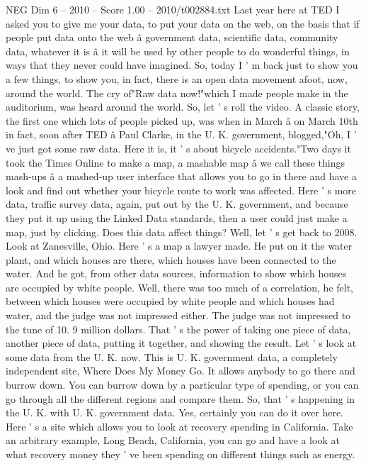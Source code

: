\begin{textsample}{NEG Dim 6 – 2010 – Score 1.00 – 2010/t002884.txt}  \label{ex:f6_neg_041}
Last year here at TED I asked you to give me your data, to put your data on the web, on the basis that if people put data onto the web â government data, scientific data, community data, whatever it is â it will be used by other people to do wonderful things, in ways that they never could have imagined.
So, today I ' m back just to show you a few things, to show you, in fact, there is an open data movement afoot, now, around the world.
The cry of"Raw data now!"which I made people make in the auditorium, was heard around the world.
So, let ' s roll the video.
A classic story, the first one which lots of people picked up, was when in March â on March 10th in fact, soon after TED â Paul Clarke, in the U.
K. government, blogged,"Oh, I ' ve just got some raw data.
Here it is, it ' s about bicycle accidents."Two days it took the Times Online to make a map, a mashable map â we call these things mash-ups â a mashed-up user interface that allows you to go in there and have a look and find out whether your bicycle route to work was affected.
Here ' s more data, traffic survey data, again, put out by the U.
K. government, and because they put it up using the Linked Data standards, then a user could just make a map, just by clicking.
Does this data affect things?
Well, let ' s get back to 2008.
Look at Zanesville, Ohio.
Here ' s a map a lawyer made.
He put on it the water plant, and which houses are there, which houses have been connected to the water.
And he got, from other data sources, information to show which houses are occupied by white people.
Well, there was too much of a correlation, he felt, between which houses were occupied by white people and which houses had water, and the judge was not impressed either.
The judge was not impressed to the tune of 10. 9 million dollars.
That ' s the power of taking one piece of data, another piece of data, putting it together, and showing the result.
Let ' s look at some data from the U.
K. now.
This is U.
K. government data, a completely independent site, Where Does My Money Go.
It allows anybody to go there and burrow down.
You can burrow down by a particular type of spending, or you can go through all the different regions and compare them.
So, that ' s happening in the U.
K. with U.
K. government data.
Yes, certainly you can do it over here.
Here ' s a site which allows you to look at recovery spending in California.
Take an arbitrary example, Long Beach, California, you can go and have a look at what recovery money they ' ve been spending on different things such as energy.

\end{textsample}
